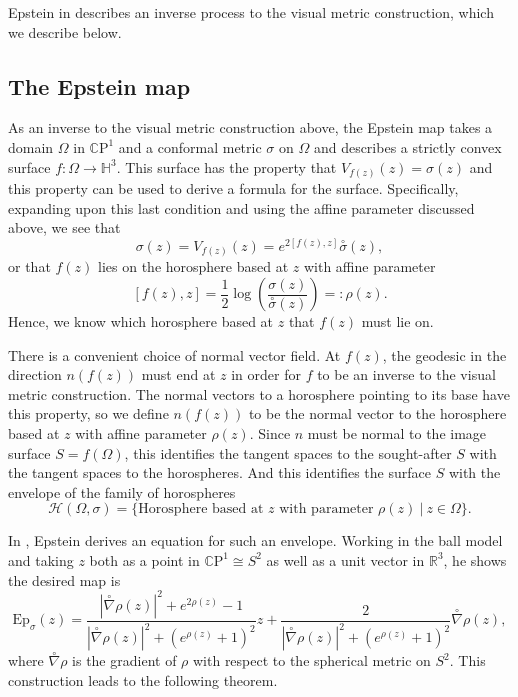 \documentclass{amsart}
\newcommand{\R}{\mathbb{R}}
\newcommand{\CP}{\mathbb{C}\mathrm{P}}
\renewcommand{\H}{\mathbb{H}}
\begin{document}
Epstein in \cite{epstein1984} describes an inverse process to the visual metric construction, which we describe below.



\subsection{The Epstein map}



As an inverse to the visual metric construction above, the Epstein map takes a domain $\Omega$ in $\CP^1$ and a conformal metric $\sigma$ on $\Omega$ and describes a strictly convex surface $f: \Omega \to \H^3$. 
This surface has the property that $V_{f(z)}(z) = \sigma(z)$ and this property can be used to derive a formula for the surface. 
Specifically, expanding upon this last condition and using the affine parameter discussed above, we see that 
\[
\sigma(z) = V_{f(z)}(z) = e^{2 [f(z),z]} \overset{\circ}{\sigma}(z),
\]
or that $f(z)$ lies on the horosphere based at $z$ with affine parameter
\[
[f(z),z] = \frac{1}{2} \log \left( \frac{\sigma(z)}{\overset{\circ}{\sigma}(z)} \right) =: \rho(z).
\]
Hence, we know which horosphere based at $z$ that $f(z)$ must lie on. 

There is a convenient choice of normal vector field. 
At $f(z)$, the geodesic in the direction $n(f(z))$ must end at $z$ in order for $f$ to be an inverse to the visual metric construction. 
The normal vectors to a horosphere pointing to its base have this property, so we define $n(f(z))$ to be the normal vector to the horosphere based at $z$ with affine parameter $\rho(z)$. 
Since $n$ must be normal to the image surface $S = f(\Omega)$, this identifies the tangent spaces to the sought-after $S$ with the tangent spaces to the horospheres. 
And this identifies the surface $S$ with the envelope of the family of horospheres
\[
\mathcal{H}(\Omega,\sigma) = \{ \text{Horosphere based at $z$ with parameter $\rho(z)$} \ | \ z \in \Omega \}.
\]


In \cite{epstein1984}, Epstein derives an equation for such an envelope. 
Working in the ball model and taking $z$ both as a point in $\CP^1 \cong S^2$ as well as a unit vector in $\R^3$, he shows the desired map is 
\[
\mathrm{Ep}_\sigma(z) = \frac{|\overset{\circ}{\nabla}\rho(z)|^2 + e^{2\rho(z)} - 1}{|\overset{\circ}{\nabla}\rho(z)|^2 + (e^{\rho(z)}+1)^2} z + \frac{2}{|\overset{\circ}{\nabla}\rho(z)|^2 + (e^{\rho(z)}+1)^2} \overset{\circ}{\nabla}\rho(z),
\]
where $\overset{\circ}{\nabla}\rho$ is the gradient of $\rho$ with respect to the spherical metric on $S^2$. 
This construction leads to the following theorem. 
\end{document}
